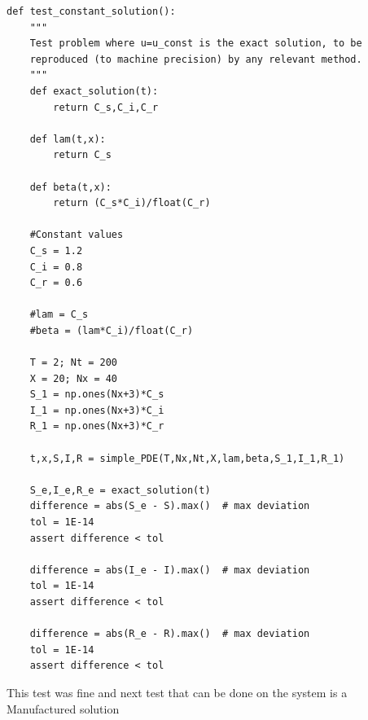 \documentclass[%
twoside,                 %
final,                   %
10pt]{article}
\begin{document}
\begin{Verbatim}[numbers=none,fontsize=\fontsize{9pt}{9pt},baselinestretch=0.95]
def test_constant_solution():
    """
    Test problem where u=u_const is the exact solution, to be
    reproduced (to machine precision) by any relevant method.
    """
    def exact_solution(t):
        return C_s,C_i,C_r
    
    def lam(t,x):
        return C_s

    def beta(t,x):
        return (C_s*C_i)/float(C_r)

    #Constant values
    C_s = 1.2
    C_i = 0.8
    C_r = 0.6
    
    #lam = C_s
    #beta = (lam*C_i)/float(C_r)
    
    T = 2; Nt = 200
    X = 20; Nx = 40
    S_1 = np.ones(Nx+3)*C_s
    I_1 = np.ones(Nx+3)*C_i
    R_1 = np.ones(Nx+3)*C_r
    
    t,x,S,I,R = simple_PDE(T,Nx,Nt,X,lam,beta,S_1,I_1,R_1)
    
    S_e,I_e,R_e = exact_solution(t)
    difference = abs(S_e - S).max()  # max deviation
    tol = 1E-14
    assert difference < tol

    difference = abs(I_e - I).max()  # max deviation
    tol = 1E-14
    assert difference < tol

    difference = abs(R_e - R).max()  # max deviation
    tol = 1E-14
    assert difference < tol
\end{Verbatim}

This test was fine and next test that can be done on the system is a Manufactured solution
\end{document}
